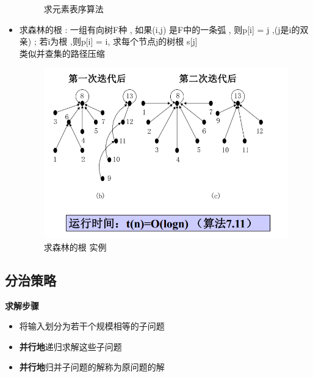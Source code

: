 \documentclass[UTF8,a4paper]{ctexart}
\begin{document}
\begin{itemize}
\begin{figure}[H]
      \caption{求元素表序算法}
    \end{figure}
    \item 求森林的根 : 一组有向树F种 , 如果(i,j) 是F中的一条弧 , 则p[i] = j ,(j是i的双亲) ; 若i为根 ,则p[i] = i, 求每个节点j的树根 s[j]\\
    类似并查集的路径压缩\\
    \begin{figure}[H]
      \centering
      \includegraphics[scale = 0.3]{assets/ParallelComputing_8ca98.png}
      \caption{求森林的根 实例}
    \end{figure}
  \end{itemize}
  \subsection{分治策略}
  \textbf{求解步骤}
  \begin{itemize}
    \item 将输入划分为若干个规模相等的子问题
    \item \textbf{并行地}递归求解这些子问题
    \item \textbf{并行地}归并子问题的解称为原问题的解
  \end{itemize}
\end{document}
